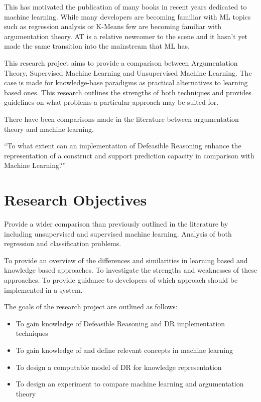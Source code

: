 This has motivated the publication of many books in recent years dedicated to machine learning. While many developers are becoming familiar with ML topics such as regression analysis or K-Means few are becoming familiar with argumentation theory. AT is a relative newcomer to the scene and it hasn’t yet made the same transition into the mainstream that ML has.

This research project aims to provide a comparison between Argumentation Theory, Supervised Machine Learning and Unsupervised Machine Learning. The case is made for knowledge-base paradigms as practical alternatives to learning based ones. This research outlines the strengths of both techniques and provides guidelines on what problems a particular approach may be suited for.

There have been comparisons made in the literature between argumentation theory and machine learning.

``To what extent can an implementation of Defeasible Reasoning enhance the representation of a construct and support prediction capacity in comparison with Machine Learning?''




\section{Research Objectives}


Provide a wider comparison than previously outlined in the literature by including unsupervised and supervised machine learning. Analysis of both regression and classification problems.

To provide an overview of the differences and similarities in learning based and knowledge based approaches. To investigate the strengths and weaknesses of these approaches. To provide guidance to developers of which approach should be implemented in a system.

The goals of the research project are outlined as follows:

\begin{itemize}

  \item To gain knowledge of Defeasible Reasoning and DR implementation techniques
  \item To gain knowledge of and define relevant concepts in machine learning
  \item To design a computable model of DR for knowledge representation
  \item To design an experiment to compare machine learning and argumentation theory 

\end{itemize}

